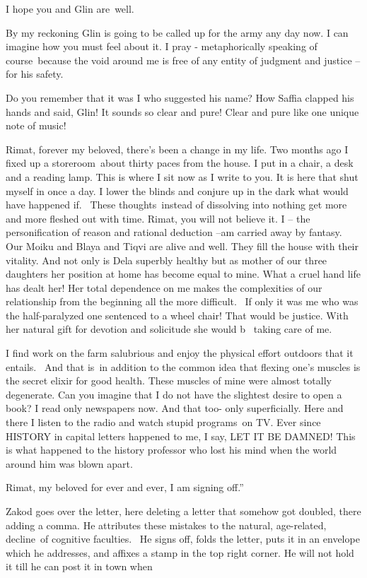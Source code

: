 \documentclass[12pt]{book}
\begin{document}
I hope you and Glin are~well.

By my reckoning Glin is going to be called up for the army any day now. I can imagine how you must feel about it. I pray
- metaphorically speaking of course~because the void around me is free of any entity of judgment and justice -- for his
safety.

Do you remember that it was I who suggested his name? How Saffia clapped his hands and said, {\textquotedbl}Glin! It
sounds so clear and pure! Clear and pure like one unique {note of music}!{\textquotedbl}

Rimat, forever my beloved, there's been a change in my life. Two months ago I fixed up a storeroom~about thirty paces
from the house. I put in a chair, a desk and a reading lamp. This is where I sit now as I write to you. It is here that
shut myself in once a day. I lower the blinds and conjure up in the dark what would have happened
{\textquotedbl}if{\textquotedbl}.~ These thoughts~instead of dissolving into nothing get more and more fleshed out with
time. Rimat, you will not believe it. I -- the personification of reason and rational deduction --am carried away by
fantasy.~ Our Moiku and Blaya and Tiqvi are alive and well. They fill the house with their vitality. And not only is
Dela superbly healthy but as mother of our three daughters her position at home has become equal to mine. What a cruel
hand life has dealt her! Her total dependence on me makes the complexities of our relationship from the beginning all
the more difficult. \ If only it was me who was the half-paralyzed one sentenced to a wheel chair! That would be
justice. With her natural gift for devotion and solicitude she would b \ taking care of me.~

I find work on the farm salubrious and enjoy the physical effort outdoors that it entails.~ And that is~in addition to
the common idea that flexing one's muscles is the secret elixir for good health. These muscles of mine were almost
totally degenerate. Can you imagine that I do not have the slightest desire to open a book? I read only newspapers now.
And that too- only superficially. Here and there I listen to the radio and watch stupid programs~on TV. Ever since
HISTORY in capital letters happened to me, I say, LET IT BE DAMNED! This is what happened to the history professor who
lost his mind when the world around him was blown apart.

Rimat, my beloved for ever and ever, I am signing off.''

Zakod goes over the letter, here deleting a letter that somehow got doubled, there adding a comma. He attributes these
mistakes to the natural, age-related, decline~of cognitive faculties. \ He signs off, folds the letter, puts it in an
envelope which he addresses, and affixes a stamp in the top right corner. He will not hold it till he can post it in
town when
\end{document}
